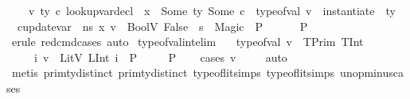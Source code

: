 \begin{isabellebody}
\ \ \ \ {\isasymAnd}v\ ty\ c{\isachardot}{\kern0pt}\ lookup{\isacharunderscore}{\kern0pt}var{\isacharunderscore}{\kern0pt}decl\ {\isasymLambda}\ x\ {\isacharequal}{\kern0pt}\ Some\ {\isacharparenleft}{\kern0pt}ty{\isacharcomma}{\kern0pt}\ Some\ c{\isacharparenright}{\kern0pt}\ {\isasymLongrightarrow}\ type{\isacharunderscore}{\kern0pt}of{\isacharunderscore}{\kern0pt}val\ v\ {\isacharequal}{\kern0pt}\ instantiate\ {\isasymOmega}\ ty\ {\isasymLongrightarrow}\ {\isacharparenleft}{\kern0pt}{\isasymLambda}{\isacharcomma}{\kern0pt}{\isasymGamma}{\isacharcomma}{\kern0pt}{\isasymOmega}\ {\isasymturnstile}\ {\isasymlangle}c{\isacharcomma}{\kern0pt}{\isacharparenleft}{\kern0pt}update{\isacharunderscore}{\kern0pt}var\ {\isasymLambda}\ n{\isacharunderscore}{\kern0pt}s\ x\ v{\isacharparenright}{\kern0pt}{\isasymrangle}\ {\isasymDown}\ BoolV\ False{\isacharparenright}{\kern0pt}\ {\isasymLongrightarrow}\ s{\isacharprime}{\kern0pt}\ {\isacharequal}{\kern0pt}\ Magic\ {\isasymLongrightarrow}\ P{\isasymrbrakk}\ {\isasymLongrightarrow}\ \isanewline
\ \ \ \ P{\isachardoublequoteclose}\isanewline
%
\isadelimproof
\ \ %
\endisadelimproof
%
\isatagproof
{}\isamarkupfalse%
\ {\isacharparenleft}{\kern0pt}erule\ red{\isacharunderscore}{\kern0pt}cmd{\isachardot}{\kern0pt}cases{\isacharsemicolon}{\kern0pt}\ auto{\isacharparenright}{\kern0pt}%
\endisatagproof
{\isafoldproof}%
%
\isadelimproof
\isanewline
%
\endisadelimproof
\isanewline
{}\isamarkupfalse%
\isanewline
\isanewline
\isanewline
\isanewline
\isanewline
{}\isamarkupfalse%
\ type{\isacharunderscore}{\kern0pt}of{\isacharunderscore}{\kern0pt}val{\isacharunderscore}{\kern0pt}int{\isacharunderscore}{\kern0pt}elim{\isacharcolon}{\kern0pt}\isanewline
\ \ {\isachardoublequoteopen}{\isasymlbrakk}\ type{\isacharunderscore}{\kern0pt}of{\isacharunderscore}{\kern0pt}val\ v\ {\isacharequal}{\kern0pt}\ TPrim\ TInt{\isacharsemicolon}{\kern0pt}\isanewline
\ \ \ \ \ {\isasymAnd}i{\isachardot}{\kern0pt}\ v\ {\isacharequal}{\kern0pt}\ LitV\ {\isacharparenleft}{\kern0pt}LInt\ i{\isacharparenright}{\kern0pt}\ {\isasymLongrightarrow}\ P\isanewline
\ \ \ {\isasymrbrakk}\ {\isasymLongrightarrow}\ P{\isachardoublequoteclose}\isanewline
%
\isadelimproof
\ \ %
\endisadelimproof
%
\isatagproof
{}\isamarkupfalse%
\ {\isacharparenleft}{\kern0pt}cases\ v{\isacharparenright}{\kern0pt}\isanewline
\ \ \ \isamarkupfalse%
\ auto{\isacharbrackleft}{\kern0pt}{}{\isacharbrackright}{\kern0pt}\isanewline
\ \ \isamarkupfalse%
\ {\isacharparenleft}{\kern0pt}metis\ prim{\isacharunderscore}{\kern0pt}ty{\isachardot}{\kern0pt}distinct{\isacharparenleft}{\kern0pt}{}{\isacharparenright}{\kern0pt}\ prim{\isacharunderscore}{\kern0pt}ty{\isachardot}{\kern0pt}distinct{\isacharparenleft}{\kern0pt}{}{\isacharparenright}{\kern0pt}\ type{\isacharunderscore}{\kern0pt}of{\isacharunderscore}{\kern0pt}lit{\isachardot}{\kern0pt}simps{\isacharparenleft}{\kern0pt}{}{\isacharparenright}{\kern0pt}\ type{\isacharunderscore}{\kern0pt}of{\isacharunderscore}{\kern0pt}lit{\isachardot}{\kern0pt}simps{\isacharparenleft}{\kern0pt}{}{\isacharparenright}{\kern0pt}\ unop{\isacharunderscore}{\kern0pt}minus{\isachardot}{\kern0pt}cases{\isacharparenright}{\kern0pt}%

\end{isabellebody}
